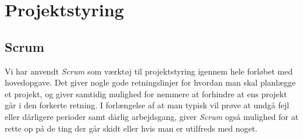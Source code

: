 \section{Projektstyring}
\subsection{Scrum}
Vi har anvendt \textit{Scrum} som værktøj til projektstyring igennem hele forløbet med hovedopgave. Det giver nogle gode retningslinjer for hvordan man skal planlægge et projekt, og giver samtidig mulighed for nemmere at forhindre at ens projekt går i den forkerte retning. I forlængelse af at man typisk vil prøve at undgå fejl eller dårligere perioder samt dårlig arbejdsgang, giver \textit{Scrum} også mulighed for at rette op på de ting der går skidt eller hvis man er utilfreds med noget.

